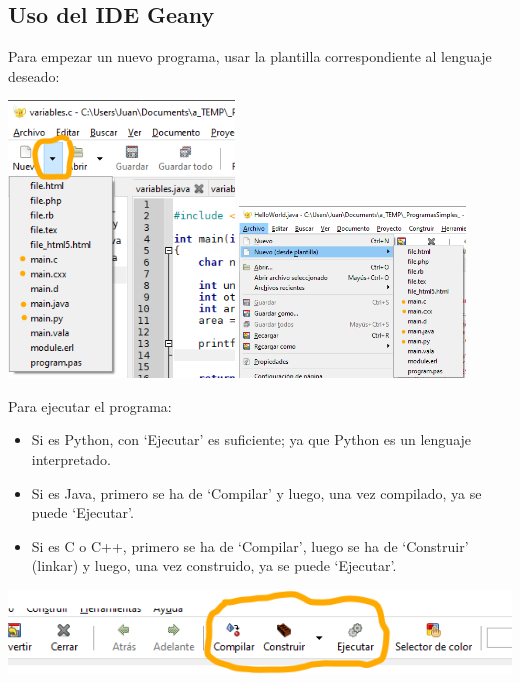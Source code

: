 \documentclass[spanish,12pt,a4paper,final,oneside]{book}
\begin{document}
\subsection{Uso del IDE Geany}

Para empezar un nuevo programa, usar la plantilla correspondiente al lenguaje deseado:

\includegraphics[width=0.45\textwidth]{Geany - nuevo - barra}
\hspace{0.1\textwidth}
\includegraphics[width=0.45\textwidth]{Geany - nuevo - menu}

Para ejecutar el programa:
\begin{itemize}
\item Si es Python, con `Ejecutar' es suficiente; ya que Python es un lenguaje interpretado.
\item Si es Java, primero se ha de `Compilar' y luego, una vez compilado, ya se puede `Ejecutar'.
\item Si es C o C++, primero se ha de `Compilar', luego se ha de `Construir' (linkar) y luego, una vez construido, ya se puede `Ejecutar'.
\end{itemize}
\includegraphics[width=\textwidth]{Geany - compilar y ejecutar - barra}
\end{document}
